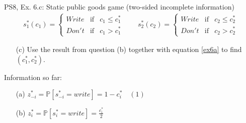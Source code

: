 \begin{frame}{PS8, Ex. 6.c: Static public goods game (two-sided incomplete information)}
    \begin{align*}
      s_1^*(c_1)=\left\{\begin{array}{rcl}
        Write & \text{if} & c_1\leq c_1^*\\
        Don't & \text{if} & c_1>c_1^*
        \end{array}\right.\quad\quad
      s_2^*(c_2)=\left\{\begin{array}{rcl}
        Write & \text{if} & c_2\leq c_2^*\\
        Don't & \text{if} & c_2>c_2^*
        \end{array}\right.
    \end{align*}
    \vspace{-12pt}
    \begin{itemize}
      \item[(c)] Use the result from question (b) together with equation \eqref{ex6a} to find $(c_1^* , c_2^*)$.
    \end{itemize}
    \begin{multicols}{2}
      \vfill\null\columnbreak
      Information so far:
      \begin{enumerate}
        \item[(a)] $z_{-i}^*=\mathbb{P}[s_{-i}^*=write]=1-c_i^*\quad(1)$
        \item[(b)] $z_i^*=\mathbb{P}[s_i^*=write]=\frac{c_i^*}{2}$
      \end{enumerate}
      \vfill\null
    \end{multicols}
\end{frame}
